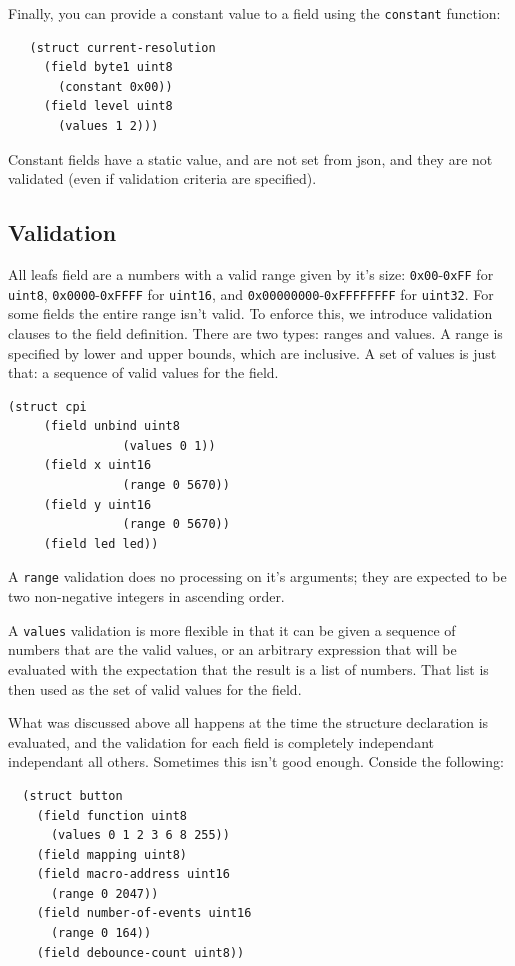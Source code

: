 \documentclass[12pt]{article}
\begin{document}
Finally, you can provide a constant value to a field using the
\verb|constant| function:

\begin{verbatim}
   (struct current-resolution
     (field byte1 uint8
       (constant 0x00))
     (field level uint8
       (values 1 2)))
\end{verbatim}

Constant fields have a static value, and are not set from json, and
they are not validated (even if validation criteria are specified).

\subsection{Validation}

All leafs field are a numbers with a valid range given by it's size:
\verb|0x00|-\verb|0xFF| for \verb|uint8|, \verb|0x0000|-\verb|0xFFFF| for \verb|uint16|, and
\verb|0x00000000|-\verb|0xFFFFFFFF| for \verb|uint32|. For some fields the entire range
isn't valid. To enforce this, we introduce validation clauses to the
field definition. There are two types: ranges and values. A range is
specified by lower and upper bounds, which are inclusive. A set of
values is just that: a sequence of valid values for the field. 

\begin{verbatim}
(struct cpi
     (field unbind uint8
                (values 0 1))
     (field x uint16
                (range 0 5670))
     (field y uint16
                (range 0 5670))
     (field led led))
\end{verbatim}

A \verb|range| validation does no processing on it's arguments; they
are expected to be two non-negative integers in ascending order.

A \verb|values| validation is more flexible in that it can be given a
sequence of numbers that are the valid values, or an
arbitrary expression that will be evaluated with the expectation that
the result is a list of numbers. That list is then used as the set of
valid values for the field.

What was discussed above all happens at the time the structure
declaration is evaluated, and the validation for each field is
completely independant independant all others. Sometimes this isn't
good enough. Conside the following:


\begin{verbatim}
  (struct button
    (field function uint8
      (values 0 1 2 3 6 8 255))
    (field mapping uint8)
    (field macro-address uint16
      (range 0 2047))
    (field number-of-events uint16
      (range 0 164))
    (field debounce-count uint8))
\end{verbatim}
\end{document}
